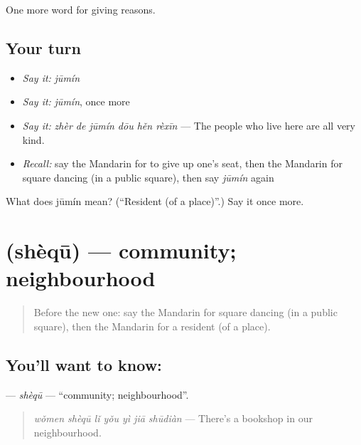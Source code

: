 \begin{grammarlens}[title={What you've built}]
One more word for giving reasons.
\end{grammarlens}

\subsection*{Your turn}
\begin{itemize}
\raggedright
  \item \emph{Say it:} \emph{jūmín}
  \item \emph{Say it:} \emph{jūmín}, once more
  \item \emph{Say it:} \emph{zhèr de jūmín dōu hěn rèxīn} — The people who live here are all very kind.
  \item \emph{Recall:} say the Mandarin for to give up one's seat, then the Mandarin for square dancing (in a public square), then say \emph{jūmín} again
\end{itemize}

\begin{tcolorbox}[breakable,colback=teal!4,colframe=teal!35!black,title={Before you move on}]
What does jūmín mean? (\textquotedblleft{}Resident (of a place)\textquotedblright{}.) Say it once more.
\end{tcolorbox}
\section[\texorpdfstring{\zh{社区} (shèqū)}{社区 (shèqū)}]{ (shèqū) — community; neighbourhood}

\label{lesson:ZH-C377-shequ}



\begin{quote}
Before the new one: say the Mandarin for square dancing (in a public square), then the Mandarin for a resident (of a place).
\end{quote}

\subsection*{You'll want to know: }
\textbf{} — \emph{shèqū} — \textquotedblleft{}community; neighbourhood\textquotedblright{}.

\begin{quote}
\textbf{} \emph{wǒmen shèqū lǐ yǒu yì jiā shūdiàn} — There's a bookshop in our neighbourhood.
\end{quote}

